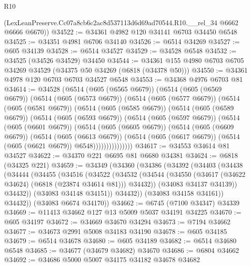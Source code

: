 \begin{lexlean}{R10}
\begin{coremodule}
      (LexLeanPreserve.Cc07a8cb6c2ac8d537113d6d69ad70544.R10.__rel_34 @6662 @6666 @6670))
@34522 := @34361 @4982 @120 @34141 @6703 @34450 @6548
@34525 := @34351 @4981 @6706 @34140
@34526 := @6514 @34269
@34527 := @605 @34139
@34528 := @6514 @34527
@34529 := @34528 @6548
@34532 := @34525 (@34526 @34529) @34450
@34544 := @34361 @155 @4980 @6703 @6705 @34269 @34529 (@34375 @50 @34269 (@6818 (@34378 @50)))
@34550 := @34361 @4978 @120 @6703 @6703 @34527 @6548
@34553 := @34368 @4976 @6703 @81
@34614 := @34528
    (@6514
      (@605 (@6565 @6679))
      (@6514
        (@605 (@6569 @6679))
        (@6514
          (@605 (@6573 @6679))
          (@6514
            (@605 (@6577 @6679))
            (@6514
              (@605 (@6581 @6679))
              (@6514
                (@605 (@6585 @6679))
                (@6514
                  (@605 (@6589 @6679))
                  (@6514
                    (@605 (@6593 @6679))
                    (@6514
                      (@605 (@6597 @6679))
                      (@6514
                        (@605 (@6601 @6679))
                        (@6514
                          (@605 (@6605 @6679))
                          (@6514
                            (@605 (@6609 @6679))
                            (@6514
                              (@605 (@6613 @6679))
                              (@6514
                                (@605 (@6617 @6679))
                                (@6514 (@605 (@6621 @6679)) @6548)))))))))))))))
@34617 := @34553 @34614 @81 @34527
@34622 := @34370 @221 @6695 @81 @6680 @34381
@34624 := @6818 (@34325 @221)
@34659 := @34349
    (@34360
      (@34386
        (@34392
          (@34403
            (@34438
              (@34444
                (@34455
                  (@34516
                    (@34522
                      (@34532
                        (@34544
                          (@34550 (@34617 (@34622 @34624) (@6818 (@23874 @34614 @81))) @34432))
                        (@34083 @34137 @34139))
                      @34432))
                  (@34083 @34148 @34151))
                @34432))
            (@34083 @34158 @34161))
          @34432))
      (@34083 @6674 @34170))
@34662 := @6745 (@7100 @34347) @34339
@34669 := @11413 @34662 @127 @13 @5009 @5037 @34191 @34225
@34670 := @605 @34197
@34672 := @34669 @34670 @34294
@34673 := @7194 @34662
@34677 := @34673 @2991 @5008 @34183 @34190
@34678 := @605 @34185
@34679 := @6514 @34678
@34680 := @605 @34189
@34682 := @6514 @34680 @6548
@34685 := @34677 (@34679 @34682) @34670
@34686 := @6804 @34662
@34692 := @34686 @5000 @5007 @34175 @34182 @34678 @34682

\end{coremodule}
\end{lexlean}
